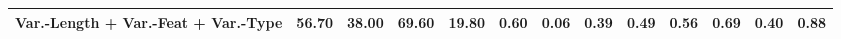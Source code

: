 \begin{tabular}{lrrrrrrrrrrrr}
Var.-Length + Var.-Feat + Var.-Type  &                                 56.70 &                                     38.00 &                                69.60 &                                     19.80 &                  0.60 &                      0.06 &                 0.39 &                      0.49 &                        0.56 &                            0.69 &                       0.40 &                            0.88 \\
\bottomrule
\end{tabular}
